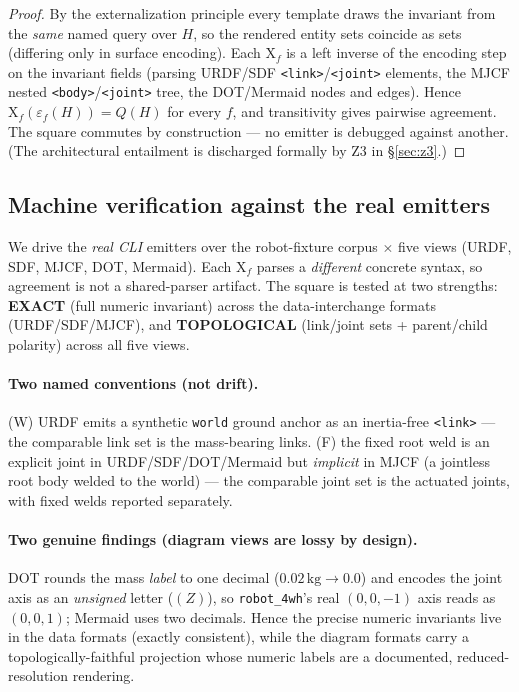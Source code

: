 \documentclass[11pt]{article}
\theoremstyle{definition}
\newcommand{\X}{\mathrm{X}}
\begin{document}
\begin{proof}
By the externalization principle every template draws the invariant from the \emph{same} named query over $H$, so
the rendered entity sets coincide as sets (differing only in surface encoding). Each $\X_f$ is a left inverse of
the encoding step on the invariant fields (parsing URDF/SDF \texttt{<link>}/\texttt{<joint>} elements, the MJCF
nested \texttt{<body>}/\texttt{<joint>} tree, the DOT/Mermaid nodes and edges). Hence $\X_f(\varepsilon_f(H)) =
Q(H)$ for every $f$, and transitivity gives pairwise agreement. The square commutes by construction --- no emitter
is debugged against another. (The architectural entailment is discharged formally by Z3 in \S\ref{sec:z3}.)
\end{proof}

\subsection{Machine verification against the real emitters}

We drive the \emph{real CLI} emitters over the robot-fixture corpus $\times$ five views (URDF, SDF, MJCF, DOT,
Mermaid). Each $\X_f$ parses a \emph{different} concrete syntax, so agreement is not a shared-parser artifact. The
square is tested at two strengths: \textbf{EXACT} (full numeric invariant) across the data-interchange formats
(URDF/SDF/MJCF), and \textbf{TOPOLOGICAL} (link/joint sets + parent/child polarity) across all five views.

\paragraph{Two named conventions (not drift).} (W) URDF emits a synthetic \texttt{world} ground anchor as an
inertia-free \texttt{<link>} --- the comparable link set is the mass-bearing links. (F) the fixed root weld is an
explicit joint in URDF/SDF/DOT/Mermaid but \emph{implicit} in MJCF (a jointless root body welded to the world)
--- the comparable joint set is the actuated joints, with fixed welds reported separately.

\paragraph{Two genuine findings (diagram views are lossy by design).} DOT rounds the mass \emph{label} to one
decimal ($0.02\,\mathrm{kg}\to0.0$) and encodes the joint axis as an \emph{unsigned} letter ($(Z)$), so
\texttt{robot\_4wh}'s real $(0,0,-1)$ axis reads as $(0,0,1)$; Mermaid uses two decimals. Hence the precise
numeric invariants live in the data formats (exactly consistent), while the diagram formats carry a
topologically-faithful projection whose numeric labels are a documented, reduced-resolution rendering.
\end{document}
